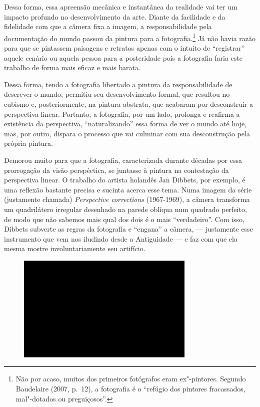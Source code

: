 Dessa forma, essa apreensão mecânica e instantânea da realidade vai ter
um impacto profundo no desenvolvimento da arte. Diante da facilidade e
da fidelidade com que a câmera fixa a imagem, a responsabilidade pela
documentação do mundo passou da pintura para a fotografia.\footnote{Não
  por acaso, muitos dos primeiros fotógrafos eram ex"-pintores. Segundo
  Baudelaire (2007, p.~12), a fotografia é o ``refúgio dos pintores
  fracassados, mal"-dotados ou preguiçosos''.} Já não havia razão para
que se pintassem paisagens e retratos apenas com o intuito de
``registrar'' aquele cenário ou aquela pessoa para a posteridade pois a
fotografia faria este trabalho de forma mais eficaz e mais barata.

Dessa forma, tendo a fotografia libertado a pintura da responsabilidade
de descrever o mundo, permitiu seu desenvolvimento formal, que resultou
no cubismo e, posteriormente, na pintura abstrata, que acabaram por
desconstruir a perspectiva linear. Portanto, a fotografia, por um lado,
prolonga e reafirma a existência da perspectiva, ``naturalizando'' essa
forma de ver o mundo até hoje, mas, por outro, dispara o processo que
vai culminar com sua desconstrução pela própria pintura.

Demorou muito para que a fotografia, caracterizada durante décadas por
essa prorrogação da visão perspéctica, se juntasse à pintura na
contestação da perspectiva linear. O trabalho do artista holandês Jan
Dibbets, por exemplo, é uma reflexão bastante precisa e sucinta acerca
esse tema. Numa imagem da série (justamente chamada) \emph{Perspective
corrections} (1967-1969), a câmera transforma um quadrilátero irregular
desenhado na parede oblíqua num quadrado perfeito, de modo que não
sabemos mais qual dos dois é o mais ``verdadeiro''. Com isso, Dibbets
subverte as regras da fotografia e ``engana'' a câmera, --- justamente
esse instrumento que vem nos iludindo desde a Antiguidade --- e faz com
que ela mesma mostre involuntariamente seu artifício.

\begin{figure}[!ht]
\centering
 \includegraphics[width=85mm]{./imgs/im1.jpg}
\caption{\tiny{}} %
\end{figure}

